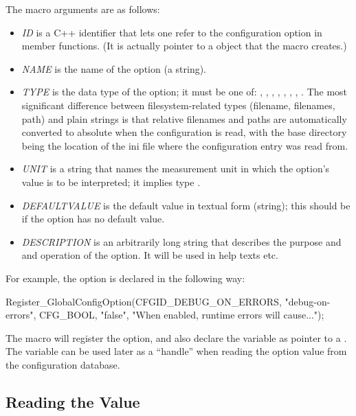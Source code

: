 The macro arguments are as follows:
\begin{itemize}
  \item \textit{ID} is a C++ identifier that lets one refer to the
        configuration option in  member functions.
        (It is actually pointer to a  object that
        the macro creates.)
  \item \textit{NAME} is the name of the option (a string).
  \item \textit{TYPE} is the data type of the option; it must be one of:
        , , , ,
        , , , .
        The most significant difference between filesystem-related types
        (filename, filenames, path) and plain strings is that relative
        filenames and paths are automatically converted to absolute
        when the configuration is read, with the base directory being the
        location of the ini file where the configuration entry was read from.
  \item \textit{UNIT} is a string that names the measurement unit in which
        the option's value is to be interpreted; it implies type .
  \item \textit{DEFAULTVALUE} is the default value in textual form (string);
        this should be  if the option has no default value.
  \item \textit{DESCRIPTION} is an arbitrarily long string that describes
        the purpose and and operation of the option. It will be used in
        help texts etc.
\end{itemize}

For example, the  option is declared in the following way:

\begin{cpp}
Register_GlobalConfigOption(CFGID_DEBUG_ON_ERRORS, "debug-on-errors",
    CFG_BOOL, "false", "When enabled, runtime errors will cause...");
\end{cpp}

The macro will register the option, and also declare the
 variable as pointer to a
. The variable can be used later as a ``handle'' when
reading the option value from the configuration database.

\subsection{Reading the Value}
\label{sec:plugin-exts:configoption:reading-values}

